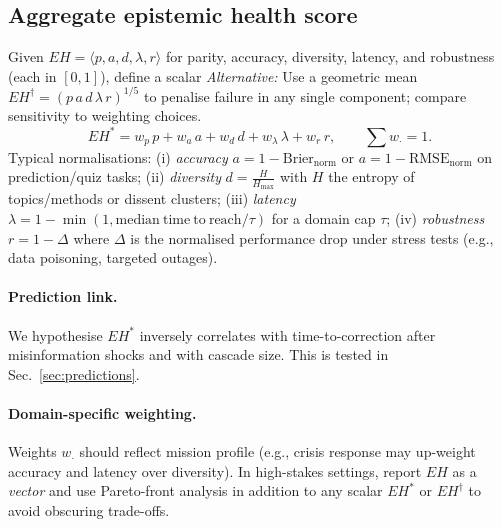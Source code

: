 \documentclass[12pt]{article}
\begin{document}
\subsection{Aggregate epistemic health score}
Given $EH=\langle p,a,d,\lambda,r\rangle$ for parity, accuracy, diversity, latency, and robustness (each in $[0,1]$), define a scalar
\emph{Alternative:} Use a geometric mean $EH^{\dagger}=(p\,a\,d\,\lambda\,r)^{1/5}$ to penalise failure in any single component; compare sensitivity to weighting choices.
\begin{equation}
EH^{\ast}=w_p\,p+w_a\,a+w_d\,d+w_\lambda\,\lambda+w_r\,r,\qquad \sum w_{\cdot}=1.
\end{equation}
Typical normalisations: (i) \emph{accuracy} $a=1-\mathrm{Brier}_{\mathrm{norm}}$ or $a=1-\mathrm{RMSE}_{\mathrm{norm}}$ on prediction/quiz tasks; (ii) \emph{diversity} $d=\frac{H}{H_{\max}}$ with $H$ the entropy of topics/methods or dissent clusters; (iii) \emph{latency} $\lambda=1-\min(1,\mathrm{median\ time\ to\ reach}/\tau)$ for a domain cap $\tau$; (iv) \emph{robustness} $r=1-\Delta$ where $\Delta$ is the normalised performance drop under stress tests (e.g., data poisoning, targeted outages).

\paragraph{Prediction link.} We hypothesise $EH^{\ast}$ inversely correlates with time-to-correction after misinformation shocks and with cascade size. This is tested in Sec.~\ref{sec:predictions}.


\paragraph{Domain-specific weighting.} Weights $w_{\cdot}$ should reflect mission profile (e.g., crisis response may up-weight accuracy and latency over diversity). In high-stakes settings, report $EH$ as a \emph{vector} and use Pareto-front analysis in addition to any scalar $EH^{\ast}$ or $EH^{\dagger}$ to avoid obscuring trade-offs.
\end{document}
